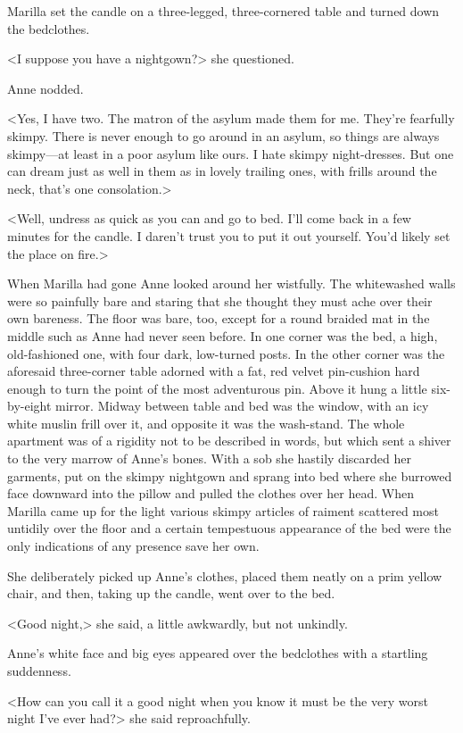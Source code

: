 Marilla set the candle on a three-legged, three-cornered table and turned down the bedclothes.

<I suppose you have a nightgown?> she questioned.

Anne nodded.

<Yes, I have two. The matron of the asylum made them for me. They're fearfully skimpy. There is never enough to go around in an asylum, so things are always skimpy—at least in a poor asylum like ours. I hate skimpy night-dresses. But one can dream just as well in them as in lovely trailing ones, with frills around the neck, that's one consolation.>

<Well, undress as quick as you can and go to bed. I'll come back in a few minutes for the candle. I daren't trust you to put it out yourself. You'd likely set the place on fire.>

When Marilla had gone Anne looked around her wistfully. The whitewashed walls were so painfully bare and staring that she thought they must ache over their own bareness. The floor was bare, too, except for a round braided mat in the middle such as Anne had never seen before. In one corner was the bed, a high, old-fashioned one, with four dark, low-turned posts. In the other corner was the aforesaid three-corner table adorned with a fat, red velvet pin-cushion hard enough to turn the point of the most adventurous pin. Above it hung a little six-by-eight mirror. Midway between table and bed was the window, with an icy white muslin frill over it, and opposite it was the wash-stand. The whole apartment was of a rigidity not to be described in words, but which sent a shiver to the very marrow of Anne's bones. With a sob she hastily discarded her garments, put on the skimpy nightgown and sprang into bed where she burrowed face downward into the pillow and pulled the clothes over her head. When Marilla came up for the light various skimpy articles of raiment scattered most untidily over the floor and a certain tempestuous appearance of the bed were the only indications of any presence save her own.

She deliberately picked up Anne's clothes, placed them neatly on a prim yellow chair, and then, taking up the candle, went over to the bed.

<Good night,> she said, a little awkwardly, but not unkindly.

Anne's white face and big eyes appeared over the bedclothes with a startling suddenness.

<How can you call it a good night when you know it must be the very worst night I've ever had?> she said reproachfully.

